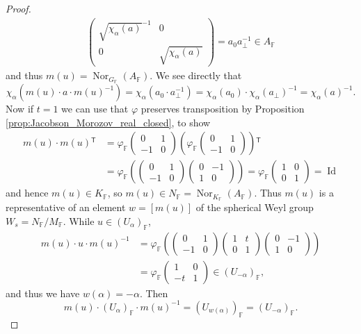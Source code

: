 \documentclass[10pt,a4paper]{amsart}
\newcommand{\F}{\mathbb{F} }
\newcommand{\tran}{{^{\mathsf{T}}\!}}
\begin{document}
\begin{proof}
\begin{align*}
\begin{pmatrix}
		\sqrt{\chi_\alpha(a)}^{-1} & 0 \\ 0 & \sqrt{\chi_\alpha(a)}
		\end{pmatrix} = a_0 a_\perp^{-1} \in A_\F
	\end{align*}
	and thus $m(u) = \operatorname{Nor}_{G_\F}(A_\F)$. We see directly that 
	$$
	\chi_\alpha (m(u) \cdot a\cdot m(u)^{-1}) = \chi_\alpha(a_0 \cdot a_\perp^{-1}) = \chi_\alpha(a_0) \cdot \chi_\alpha(a_\perp)^{-1} = \chi_\alpha(a)^{-1}.
	$$
	Now if $t=1$ we can use that $\varphi$ preserves transposition by Proposition \ref{prop:Jacobson_Morozov_real_closed}, to show
	\begin{align*}
		m(u) \cdot m(u)\tran &= \varphi_\F \begin{pmatrix}
			0 & 1 \\ -1 & 0
		\end{pmatrix} \left( \varphi_\F \begin{pmatrix}
			0 & 1 \\ -1 & 0
		\end{pmatrix}\right)\tran \\
		& = \varphi_\F \left( \begin{pmatrix}
			0 & 1 \\ -1 & 0
		\end{pmatrix}   \begin{pmatrix}
			0 & -1 \\ 1 & 0
		\end{pmatrix} \right)= \varphi_\F\begin{pmatrix}
			1 & 0 \\ 0 & 1
		\end{pmatrix} = \operatorname{Id}
	\end{align*}
	and hence $m(u)\in K_\F$, so $m(u) \in N_{\F} = \operatorname{Nor}_{K_\F}(A_\F)$. Thus $m(u)$ is a representative of an element $w=[m(u)]$ of the spherical Weyl group $W_s = N_\F/M_\F$. While $u\in (U_{\alpha})_\F$,
	\begin{align*}
		m(u)\cdot u\cdot m(u)^{-1} &= \varphi_\F \left( \begin{pmatrix}
			0 & 1 \\ -1 & 0
		\end{pmatrix}\begin{pmatrix}
			1 & t \\ 0 & 1
		\end{pmatrix} \begin{pmatrix}
			0 & -1 \\ 1 & 0
		\end{pmatrix} \right) \\
		&= \varphi_\F \begin{pmatrix}
			1 & 0 \\ -t & 1
		\end{pmatrix} \in (U_{-\alpha})_\F,
	\end{align*}
	and thus we have $w(\alpha) = -\alpha$. Then 
$$
m(u) \cdot (U_\alpha)_\F \cdot  m(u)^{-1} = (U_{w(\alpha)})_\F =  (U_{-\alpha})_\F.
$$
\end{proof}
\end{document}

